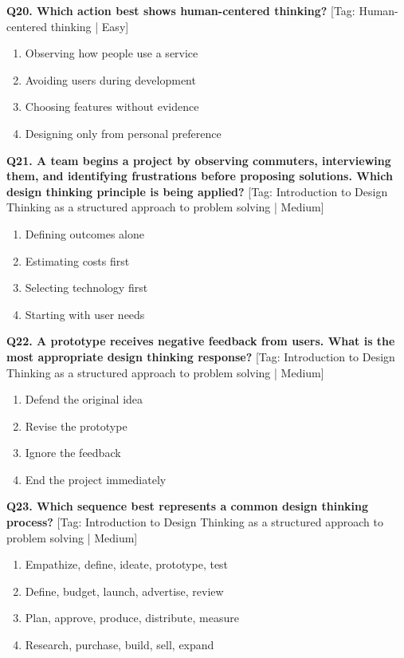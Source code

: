 \noindent\textbf{Q20. Which action best shows human-centered thinking?} \hfill [Tag: Human-centered thinking | Easy]
\begin{enumerate}[label=(\alph*),topsep=2pt,itemsep=1pt,partopsep=0pt,parsep=0pt]
    \item {Observing how people use a service}
    \item {Avoiding users during development}
    \item {Choosing features without evidence}
    \item {Designing only from personal preference}
\end{enumerate}
\vspace{2mm}

\noindent\textbf{Q21. A team begins a project by observing commuters, interviewing them, and identifying frustrations before proposing solutions. Which design thinking principle is being applied?} \hfill [Tag: Introduction to Design Thinking as a structured approach to problem solving | Medium]
\begin{enumerate}[label=(\alph*),topsep=2pt,itemsep=1pt,partopsep=0pt,parsep=0pt]
    \item {Defining outcomes alone}
    \item {Estimating costs first}
    \item {Selecting technology first}
    \item {Starting with user needs}
\end{enumerate}
\vspace{2mm}

\noindent\textbf{Q22. A prototype receives negative feedback from users. What is the most appropriate design thinking response?} \hfill [Tag: Introduction to Design Thinking as a structured approach to problem solving | Medium]
\begin{enumerate}[label=(\alph*),topsep=2pt,itemsep=1pt,partopsep=0pt,parsep=0pt]
    \item {Defend the original idea}
    \item {Revise the prototype}
    \item {Ignore the feedback}
    \item {End the project immediately}
\end{enumerate}
\vspace{2mm}

\noindent\textbf{Q23. Which sequence best represents a common design thinking process?} \hfill [Tag: Introduction to Design Thinking as a structured approach to problem solving | Medium]
\begin{enumerate}[label=(\alph*),topsep=2pt,itemsep=1pt,partopsep=0pt,parsep=0pt]
    \item {Empathize, define, ideate, prototype, test}
    \item {Define, budget, launch, advertise, review}
    \item {Plan, approve, produce, distribute, measure}
    \item {Research, purchase, build, sell, expand}
\end{enumerate}
\vspace{2mm}

